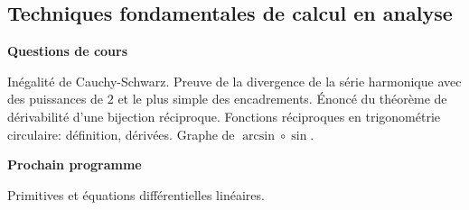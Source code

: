 





\subsection{Techniques fondamentales de calcul en analyse}



\bigskip
\begin{center}
 \textbf{Questions de cours}
\end{center}
Inégalité de Cauchy-Schwarz. Preuve de la divergence de la série harmonique avec des puissances de $2$ et le plus simple des encadrements. \'Enoncé du théorème de dérivabilité d'une bijection réciproque. Fonctions réciproques en trigonométrie circulaire: définition, dérivées. Graphe de $\arcsin \circ \sin$. 

\begin{center}
 \textbf{Prochain programme}
\end{center}

Primitives et équations différentielles linéaires.

